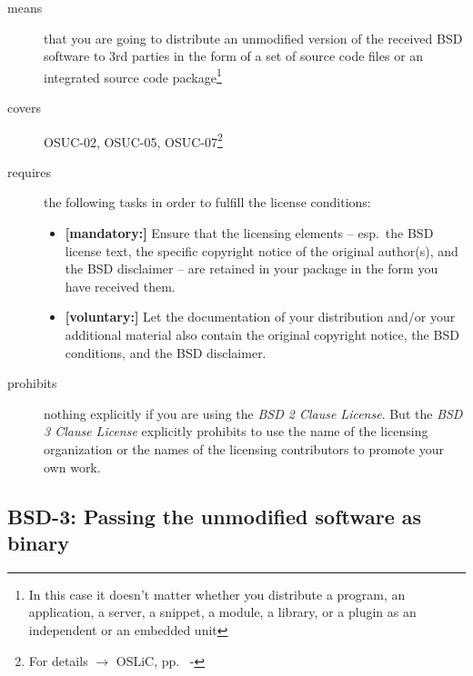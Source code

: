 \begin{description}
\item[means] that you are going to distribute an unmodified version of the
received BSD software to 3rd parties in the form of a set of source code files or an
integrated source code package\footnote{In this case it doesn't matter whether
you  distribute a program, an application, a server, a snippet, a module, a
library, or a plugin as an independent or an embedded unit}

\item[covers] OSUC-02, OSUC-05, OSUC-07\footnote{For details $\rightarrow$ OSLiC, pp.\ 
\pageref{OSUC-02-DEF} - \pageref{OSUC-07-DEF}}

\item[requires] the following tasks in order to fulfill the license conditions:
\begin{itemize}
  \item \textbf{[mandatory:]} Ensure that the licensing elements -- esp.\ the
  BSD license text, the specific copyright notice of the original author(s), and
  the BSD disclaimer -- are retained in your package in the form you have
  received them.
  \item \textbf{[voluntary:]} Let the documentation of your distribution
  and/or your additional material also contain the original copyright notice, the
  BSD conditions, and the BSD disclaimer.
\end{itemize}

\item[prohibits] nothing explicitly if you are using the \emph{BSD 2 Clause
License}. But the \emph{BSD 3 Clause License} explicitly prohibits to use the
name of the licensing organization or the names of the licensing contributors to
promote your own work.

\end{description}

\subsection{BSD-3: Passing the unmodified software as binary}

